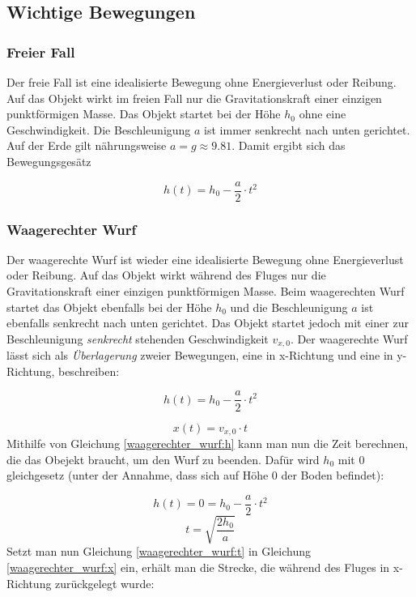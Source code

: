 \documentclass[a4paper]{article}
\begin{document}
		\subsection{Wichtige Bewegungen}
			\subsubsection{Freier Fall}
				Der freie Fall ist eine idealisierte Bewegung ohne Energieverlust oder Reibung. Auf das Objekt wirkt im freien Fall nur die Gravitationskraft einer einzigen punktförmigen Masse. Das Objekt startet bei der Höhe $h_0$ ohne eine Geschwindigkeit. Die Beschleunigung $a$ ist immer senkrecht nach unten gerichtet. Auf der Erde gilt nährungsweise $a=g\approx9.81$. Damit ergibt sich das Bewegungsgesätz
				
				\begin{equation}
					h(t) = h_0 - \frac{a}{2}\cdot t^2
				\end{equation}
			
			\subsubsection{Waagerechter Wurf}
				Der waagerechte Wurf ist wieder eine idealisierte Bewegung ohne Energieverlust oder Reibung. Auf das Objekt wirkt während des Fluges nur die Gravitationskraft einer einzigen punktförmigen Masse. Beim waagerechten Wurf startet das Objekt ebenfalls bei der Höhe $h_0$ und die Beschleunigung $a$ ist ebenfalls senkrecht nach unten gerichtet. Das Objekt startet jedoch mit einer zur Beschleunigung \textit{senkrecht} stehenden Geschwindigkeit $v_{x,0}$. Der waagerechte Wurf lässt sich als \textit{Überlagerung} zweier Bewegungen, eine in x-Richtung und eine in y-Richtung, beschreiben:
				
				\begin{equation}\label{waagerechter_wurf:h}
					h(t) = h_0 - \frac{a}{2}\cdot t^2
				\end{equation}
				
				\begin{equation}\label{waagerechter_wurf:x}
					x(t) = v_{x,0}\cdot t
				\end{equation}
				Mithilfe von Gleichung \ref{waagerechter_wurf:h} kann man nun die Zeit berechnen, die das Obejekt braucht, um den Wurf zu beenden. Daf\"ur wird $h_0$ mit $0$ gleichgesetz (unter der Annahme, dass sich auf Höhe $0$ der Boden befindet):
				
				\begin{equation}
					h(t) = 0 =  h_0 - \frac{a}{2}\cdot t^2
				\end{equation}
				\begin{equation}\label{waagerechter_wurf:t}
					t = \sqrt{\frac{2h_0}{a}}
				\end{equation}
				Setzt man nun Gleichung \ref{waagerechter_wurf:t} in Gleichung \ref{waagerechter_wurf:x}  ein, erhält man die Strecke, die während des Fluges in x-Richtung zur\"uckgelegt wurde:
			
\end{document}
